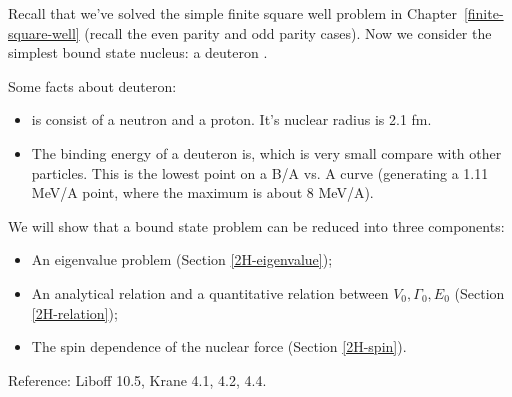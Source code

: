 \documentclass{school-22.101-notes}
\date{October 17, 2011}
\begin{document}
\maketitle


Recall that we've solved the simple finite square well problem in Chapter~\ref{finite-square-well} (recall the even parity and odd parity cases). Now we consider the simplest bound state nucleus: a deuteron . 

Some facts about deuteron: 
\begin{itemize}
\item {} is consist of a neutron and a proton. It's nuclear radius is 2.1 fm. 
\item The binding energy of a deuteron is, 
  which is very small compare with other particles. This is the lowest point on a B/A vs. A curve (generating a 1.11 MeV/A point, where the maximum is about 8 MeV/A). 
\end{itemize}


We will show that a bound state problem can be reduced into three components:
\begin{itemize}
\item An eigenvalue problem (Section \ref{2H-eigenvalue});
\item An analytical relation and a quantitative relation between $V_0, \Gamma_0, E_0$ (Section \ref{2H-relation});
\item The spin dependence of the nuclear force (Section \ref{2H-spin}).
\end{itemize}
Reference: Liboff 10.5, Krane 4.1, 4.2, 4.4.
\end{document}
